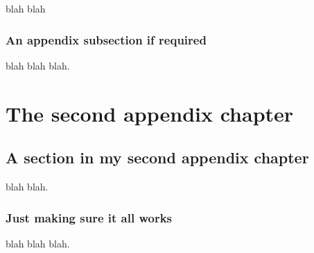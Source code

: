 \documentclass[grad,lot,lof,11pt,oneside,onehalfspace]{RUthesis}
\begin{document}
blah blah

\subsection{An appendix subsection if required}

blah blah blah.

\chapter{The second appendix chapter}

\section{A section in my second appendix chapter}

blah blah.

\subsection{Just making sure it all works}

blah blah blah.

\cleardoublepage

\end{document}
